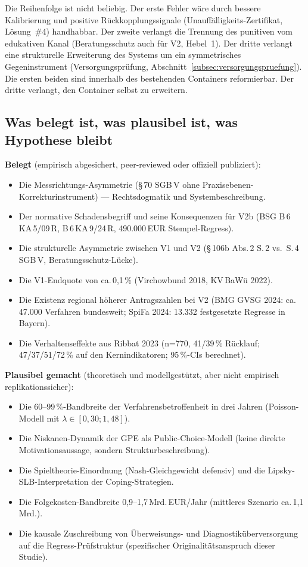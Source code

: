 \documentclass{umbruch-position}
\begin{document}
\noindent Die Reihenfolge ist nicht beliebig. Der erste Fehler wäre durch bessere Kalibrierung und positive Rückkopplungssignale (Unauffälligkeits-Zertifikat, Lösung~\#4) handhabbar. Der zweite verlangt die Trennung des punitiven vom edukativen Kanal (Beratungs\-schutz auch für V2, Hebel~1). Der dritte verlangt eine strukturelle Erweiterung des Systems um ein symmetrisches Gegeninstrument (Versorgungsprüfung, Abschnitt~\ref{subsec:versorgungspruefung}). Die ersten beiden sind innerhalb des bestehenden Containers reformierbar. Der dritte verlangt, den Container selbst zu erweitern.

\subsection{Was belegt ist, was plausibel ist, was Hypothese bleibt}

\textbf{Belegt} (empirisch abgesichert, peer-reviewed oder offiziell publiziert):

\begin{itemize}[nosep]
  \item Die Messrichtungs-Asymmetrie (\S\,70 SGB\,V ohne Praxis\-ebenen-Korrekturinstrument) --- Rechts\-dogmatik und System\-beschreibung.
  \item Der normative Schadensbegriff und seine Konsequenzen für V2b (BSG B\,6\,KA\,5/09\,R, B\,6\,KA\,9/24\,R, 490.000\,EUR Stempel-Regress).
  \item Die strukturelle Asymmetrie zwischen V1 und V2 (\S\,106b Abs.\,2 S.\,2 vs.\ S.\,4 SGB\,V, Beratungs\-schutz-Lücke).
  \item Die V1-Endquote von ca.\,0,1\,\% (Virchowbund 2018, KV\,BaWü 2022).
  \item Die Existenz regional höherer Antragszahlen bei V2 (BMG GVSG 2024: ca.\,47.000 Verfahren bundesweit; SpiFa 2024: 13.332 festgesetzte Regresse in Bayern).
  \item Die Verhaltens\-effekte aus Ribbat 2023 (n=770, 41/39\,\% Rücklauf; 47/37/51/72\,\% auf den Kernindikatoren; 95\,\%-CIs berechnet).
\end{itemize}

\textbf{Plausibel gemacht} (theoretisch und modell\-gestützt, aber nicht empirisch replikationssicher):

\begin{itemize}[nosep]
  \item Die 60--99\,\%-Bandbreite der Verfahrens\-betroffenheit in drei Jahren (Poisson-Modell mit $\lambda \in [0{,}30; 1{,}48]$).
  \item Die Niskanen-Dynamik der GPE als Public-Choice-Modell (keine direkte Motivations\-aussage, sondern Struktur\-beschreibung).
  \item Die Spieltheorie-Einordnung (Nash-Gleichgewicht defensiv) und die Lipsky-SLB-Interpretation der Coping-Strategien.
  \item Die Folgekosten-Bandbreite 0,9--1,7\,Mrd.\,EUR/Jahr (mittleres Szenario ca.\,1,1\,Mrd.).
  \item Die kausale Zuschreibung von Überweisungs- und Diagnostik\-überversorgung auf die Regress-Prüfstruktur (spezifischer Originalitäts\-anspruch dieser Studie).
\end{itemize}
\end{document}
